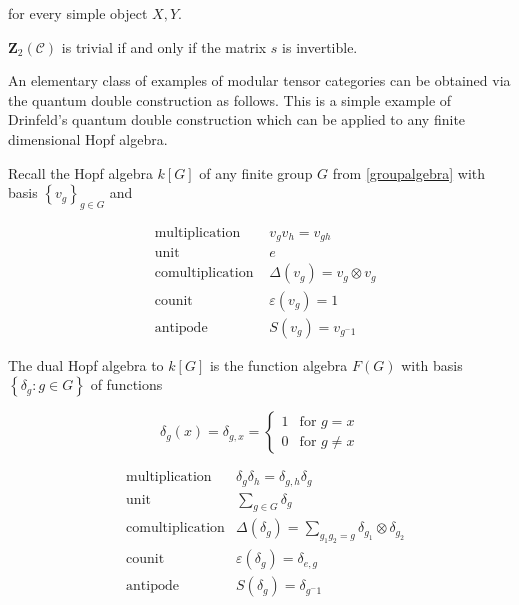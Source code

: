 for every simple object $X,Y$.

\begin{theorem}
    $\mathbf{Z}_2(\mathcal{C})$ is trivial if and only if the matrix $s$ is invertible. 
\end{theorem}

\begin{example}
    An elementary class of examples of modular tensor categories can be
    obtained via the quantum double construction as follows. This is a simple
    example of Drinfeld's quantum double construction which can be applied to
    any finite dimensional Hopf algebra.


    Recall the Hopf algebra $k[G]$ of any finite group $G$ from
    \ref{groupalgebra} with basis $\left\{ v_g \right\}_{g \in G}$ and

    \begin{align}
        &\text{multiplication }   & v_g v_h = v_{gh} \\
        &\text{unit }             & e \\
        &\text{comultiplication } & \Delta(v_g) = v_g \otimes v_g \\
        &\text{counit }           & \varepsilon(v_g) = 1 \\
        &\text{antipode }         & S(v_g) = v_{g^-1}
    \end{align}

    The dual Hopf algebra to $k[G]$ is the function algebra $F(G)$ with basis
    $\left\{ \delta_g : g \in G \right\}$ of functions

    \begin{equation}
        \delta_g(x) = \delta_{g,x} = \begin{cases} 1 &\text{for $g = x$} \\ 0 &\text{for $g \neq x$} \end{cases}
    \end{equation}

    \begin{align}
        &\text{multiplication} &\delta_g \delta_h = \delta_{g,h} \delta_g\\
        &\text{unit}           &\sum_{g \in G} \delta_g \\
        &\text{comultiplication} &\Delta(\delta_g) = \sum_{g_1 g_2 = g} \delta_{g_1} \otimes \delta_{g_2}\\
        &\text{counit}           &\varepsilon(\delta_g) = \delta_{e,g} \\
        &\text{antipode}         &S(\delta_g) = \delta_{g^-1}
    \end{align}



\end{example}
